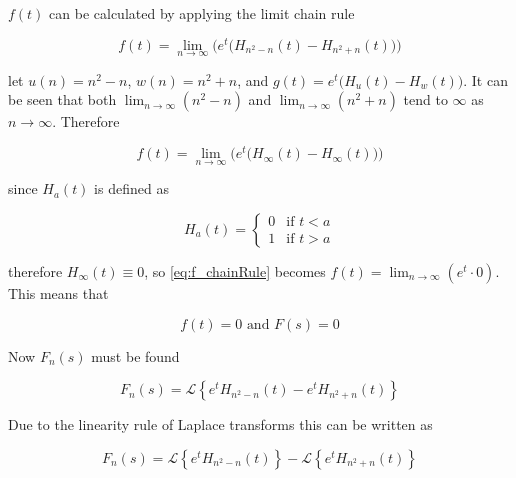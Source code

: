 \documentclass[a4paper,10pt,reqno]{amsart}
\numberwithin{equation}{section}
\newcommand{\lap}{\mathscr{L}}
\begin{document}
$f(t)$ can be calculated by applying the limit chain rule

\begin{equation}
     f(t) = \lim_{n \to \infty} \bigg(e^t\big(H_{n^2 - n}(t) - H_{n^2 + n}(t)\big)\bigg)
\end{equation}
\vspace{1pt}

let $u(n) = n^2 - n$, $w(n) = n^2 + n$, and $g(t) = e^t\big(H_u(t) - H_w(t)\big)$. It can be seen that both $\lim_{n \to \infty} (n^2 - n)$ and $\lim_{n \to \infty} (n^2 + n)$ tend to  $\infty$ as $n \to \infty$. Therefore

\begin{equation}\label{eq:f_chainRule}
     f(t) = \lim_{n \to \infty} \bigg(e^t\big(H_{\infty}(t) - H_{\infty}(t)\big)\bigg)
\end{equation}
\vspace{1pt}

since $H_a(t)$ is defined as

\begin{equation}
    H_a(t) =
     \begin{cases}
         0 & \text{if } t < a \\
         1 & \text{if } t > a
     \end{cases}
\end{equation}
\vspace{1pt}

therefore $H_{\infty}(t) \equiv 0$, so \eqref{eq:f_chainRule} becomes $f(t) = \lim_{n \to \infty} (e^t \cdot 0)$. This means that

\begin{equation}
     f(t) = 0 \text{ and } F(s) = 0 \label{eq:F}
\end{equation}
\vspace{1pt}

Now $F_n(s)$ must be found

\begin{equation}
     F_n(s) = \lap\left\{e^t H_{n^2 - n}(t) - e^t H_{n^2 + n}(t)\right\}
\end{equation}
\vspace{1pt}

Due to the linearity rule of Laplace transforms this can be written as

\begin{equation}
     F_n(s) = \lap\left\{e^t H_{n^2 - n}(t)\right\} - \lap\left\{e^t H_{n^2 + n}(t)\right\}
\end{equation}
\vspace{1pt}
\end{document}
